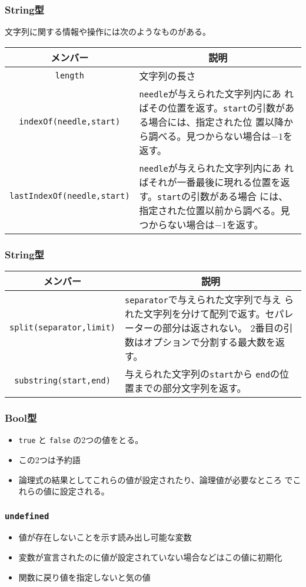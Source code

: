 \begin{frame}[containsverbatim]
 \frametitle{String型}
文字列に関する情報や操作には次のようなものがある。
\begin{center}
  \begin{tabular}{|c|m{}|}\hline
 メンバー&\multicolumn{1}{c|}{説明} \\\hline
  \Verb+length+ &文字列の長さ\\ \hline
\Verb+indexOf(needle,start)+& \Verb+needle+が与えられた文字列内にあ
      ればその位置を返す。\Verb+start+の引数がある場合には、指定された位
      置以降から調べる。見つからない場合は$-1$を返す。\\\hline
\Verb+lastIndexOf(needle,start)+& \Verb+needle+が与えられた文字列内にあ
      ればそれが一番最後に現れる位置を返す。\Verb+start+の引数がある場合
      には、指定された位置以前から調べる。見つからない場合は$-1$を返す。\\\hline
  \end{tabular}
\end{center}
\end{frame}
\begin{frame}[containsverbatim]
 \frametitle{String型}
\begin{center}
 \begin{tabular}{|c|m{}|}\hline
 メンバー&\multicolumn{1}{c|}{説明} \\\hline
  \Verb+split(separator,limit)+&\Verb+separator+で与えられた文字列で与え
      られた文字列を分けて配列で返す。セパレーターの部分は返されない。
      2番目の引数はオプションで分割する最大数を返す。\\ \hline
  \Verb+substring(start,end)+&与えられた文字列の\Verb+start+から
      \Verb+end+の位置までの部分文字列を返す。\\ \hline
\end{tabular}
\end{center}
\end{frame}
\begin{frame}[containsverbatim]
 \frametitle{Bool型}
 \begin{itemize}
  \item \Verb+true+ と \Verb+false+ の2つの値をとる。
  \item この2つは予約語
  \item 論理式の結果としてこれらの値が設定されたり、論理値が必要なところ
        でこれらの値に設定される。
 \end{itemize}
\end{frame}
\begin{frame}[containsverbatim]
 \frametitle{\texttt{undefined}}
 \begin{itemize}
  \item 値が存在しないことを示す読み出し可能な変数
  \item 変数が宣言されたのに値が設定されていない場合などはこの値に初期化
  \item 関数に戻り値を指定しないと気の値
 \end{itemize}
\end{frame}
